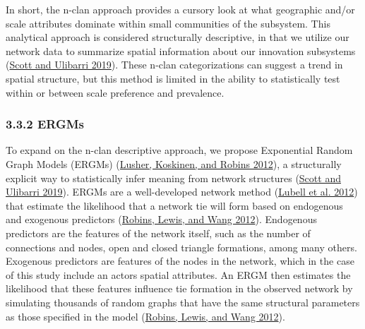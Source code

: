 \documentclass[twoside,12pt,final]{ucthesis-CA2012}
\begin{document}
\begin{ucmainmatter}
In short, the n-clan approach provides a cursory look at what geographic
and/or scale attributes dominate within small communities of the
subsystem. This analytical approach is considered structurally
descriptive, in that we utilize our network data to summarize spatial
information about our innovation subsystems
(\protect\hyperlink{ref-Scott_Ulibarri_2019}{Scott and Ulibarri 2019}). These
n-clan categorizations can suggest a trend in spatial structure, but
this method is limited in the ability to statistically test within or
between scale preference and prevalence.

\hypertarget{ergms}{%
\subsubsection{3.3.2 ERGMs}\label{ergms}}

To expand on the n-clan descriptive approach, we propose Exponential
Random Graph Models (ERGMs)
(\protect\hyperlink{ref-Lusher_Koskinen_Robins_2012}{Lusher, Koskinen, and Robins 2012}),
a structurally explicit way to statistically infer meaning from network
structures
(\protect\hyperlink{ref-Scott_Ulibarri_2019}{Scott and Ulibarri 2019}). ERGMs
are a well-developed network method
(\protect\hyperlink{ref-Lubell_Scholz_Berardo_Robins_2012}{Lubell et al. 2012})
that estimate the likelihood that a network tie will form based on
endogenous and exogenous predictors
(\protect\hyperlink{ref-Robins_Lewis_Wang_2012}{Robins, Lewis, and Wang 2012}).
Endogenous predictors are the features of the network itself, such as
the number of connections and nodes, open and closed triangle
formations, among many others. Exogenous predictors are features of the
nodes in the network, which in the case of this study include an
actors\textquotesingle{} spatial attributes. An ERGM then estimates the likelihood that
these features influence tie formation in the observed network by
simulating thousands of random graphs that have the same structural
parameters as those specified in the model
(\protect\hyperlink{ref-Robins_Lewis_Wang_2012}{Robins, Lewis, and Wang 2012}).


\end{ucmainmatter}
\end{document}
